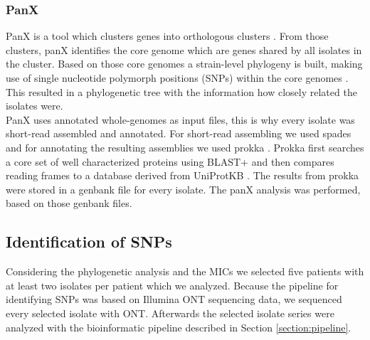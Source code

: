 \subsubsection{PanX}
PanX is a tool which clusters genes into orthologous clusters \cite{ding_panx:_2018}. From those clusters, panX identifies the core genome which are genes shared by all isolates in the cluster. Based on those core genomes a strain-level phylogeny is built, making use of single nucleotide polymorph positions (SNPs) within the core genomes \cite{ding_panx:_2018}. This resulted in a phylogenetic tree with the information how closely related the isolates were. \\ 
PanX uses annotated whole-genomes as input files, this is why every isolate was short-read assembled and annotated. For short-read assembling we used spades and for annotating the resulting assemblies we used prokka \cite{nurk_assembling_2013} \cite{seemann_prokka:_2014}. Prokka first searches a core set of well characterized proteins using BLAST+ and then compares reading frames to a database derived from UniProtKB \cite{seemann_prokka:_2014}. The results from prokka were stored in a genbank file for every isolate. The panX analysis was performed, based on those genbank files. \\

\subsection{Identification of SNPs}
Considering the phylogenetic analysis and the MICs we selected five patients with at least two isolates per patient which we analyzed. Because the pipeline for identifying SNPs was based on Illumina ONT sequencing data, we sequenced every selected isolate with ONT. 
Afterwards the selected isolate series were analyzed with the bioinformatic pipeline described in Section \ref{section:pipeline}.
